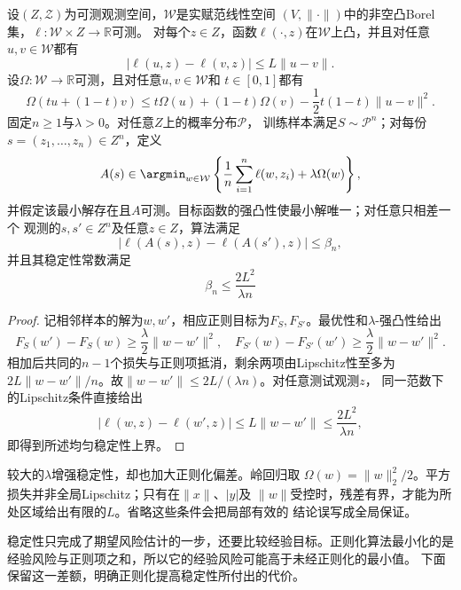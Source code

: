 \begin{theorem}[强凸正则化的稳定性]
\label{thm:regularized-erm-stability}
设$(Z,\mathcal Z)$为可测观测空间，$\mathcal W$是实赋范线性空间
$(V,\|\cdot\|)$中的非空凸Borel集，$\ell:\mathcal W\times Z\to\mathbb R$可测。
对每个$z\in Z$，函数$\ell(\cdot,z)$在$\mathcal W$上凸，并且对任意
$u,v\in\mathcal W$都有
\[
 |\ell(u,z)-\ell(v,z)|\leq L\|u-v\|.
\]
设$\Omega:\mathcal W\to\mathbb R$可测，且对任意$u,v\in\mathcal W$和
$t\in[0,1]$都有
\[
 \Omega(tu+(1-t)v)
 \leq t\Omega(u)+(1-t)\Omega(v)-\frac12t(1-t)\|u-v\|^2.
\]
固定$n\geq1$与$\lambda>0$。对任意$Z$上的概率分布$\mathcal P$，
训练样本满足$S\sim\mathcal P^n$；对每份$s=(z_1,\ldots,z_n)\in Z^n$，定义
\[
 A(s)\in\argmin_{w\in\mathcal W}
 \left\{\frac1n\sum_{i=1}^n\ell(w,z_i)+\lambda\Omega(w)\right\},
\]
并假定该最小解存在且$A$可测。目标函数的强凸性使最小解唯一；对任意只相差一个
观测的$s,s'\in Z^n$及任意$z\in Z$，算法满足
\[
 |\ell(A(s),z)-\ell(A(s'),z)|\leq\beta_n,
\]
并且其稳定性常数满足
\begin{equation}
 \beta_n\leq\frac{2L^2}{\lambda n}
 \label{eq:regularized-stability-bound}
\end{equation}
\end{theorem}

\begin{proof}
记相邻样本的解为$w,w'$，相应正则目标为$F_S,F_{S'}$。最优性和$\lambda$-强凸性给出
\begin{equation*}
 F_S(w')-F_S(w)\geq\frac\lambda2\|w-w'\|^2,
 \quad
 F_{S'}(w)-F_{S'}(w')\geq\frac\lambda2\|w-w'\|^2.
\end{equation*}
相加后共同的$n-1$个损失与正则项抵消，剩余两项由Lipschitz性至多为
$2L\|w-w'\|/n$。故$\|w-w'\|\leq2L/(\lambda n)$。对任意测试观测$z$，
同一范数下的Lipschitz条件直接给出
\[
 |\ell(w,z)-\ell(w',z)|
 \leq L\|w-w'\|
 \leq\frac{2L^2}{\lambda n},
\]
即得到所述均匀稳定性上界。
\end{proof}

较大的$\lambda$增强稳定性，却也加大正则化偏差。岭回归取
$\Omega(w)=\|w\|_2^2/2$。平方损失并非全局Lipschitz；只有在$\|x\|$、$|y|$及
$\|w\|$受控时，残差有界，才能为所处区域给出有限的$L$。省略这些条件会把局部有效的
结论误写成全局保证。

稳定性只完成了期望风险估计的一步，还要比较经验目标。正则化算法最小化的是
经验风险与正则项之和，所以它的经验风险可能高于未经正则化的最小值。
下面保留这一差额，明确正则化提高稳定性所付出的代价。

